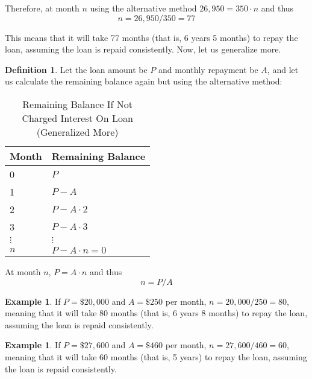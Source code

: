 \documentclass[12pt,letterpaper]{amsart}
\theoremstyle{definition} %
\newtheorem{definition}[theorem]{Definition} %
\newtheorem{example}[theorem]{Example}
\begin{document}
\par Therefore, at month $n$ using the alternative method $26,950=350\cdot n$ and thus
$$n=26,950/350=77$$ %

\par This means that it will take 77 months (that is, 6 years 5 months) to repay the loan, assuming the loan is repaid consistently. Now, let us generalize more.

\vfill %
\pagebreak

\begin{definition}Let the loan amount be $P$ and monthly repayment be $A$, and let us calculate the remaining balance again but using the alternative method:\end{definition}

\begin{table}[ht]\caption{Remaining Balance If Not Charged Interest On Loan (Generalized More)}\begin{tabular}{l|l}%
\hline\hline
Month			&	Remaining Balance\\
\hline
0				&	$P$\\
1				&	$P-A$\\
2				&	$P-A\cdot 2$\\
3				&	$P-A\cdot 3$\\
$\vdots$	&	$\vdots$\\
$n$			& 	$P-A\cdot n=0$\\
\hline\end{tabular}\end{table}

\par At month $n$, $P=A\cdot n$ and thus
\begin{equation}\label{eqn}\boxed{n=P/A}\end{equation} %

\begin{example}If $P=\$20,000$ and $A=\$250$ per month, $n=20,000/250=80$, meaning that it will take 80 months (that is, 6 years 8 months) to repay the loan, assuming the loan is repaid consistently.\end{example}

\begin{example}If $P=\$27,600$ and $A=\$460$ per month, $n=27,600/460=60$, meaning that it will take 60 months (that is, 5 years) to repay the loan, assuming the loan is repaid consistently.\end{example}
\end{document}
